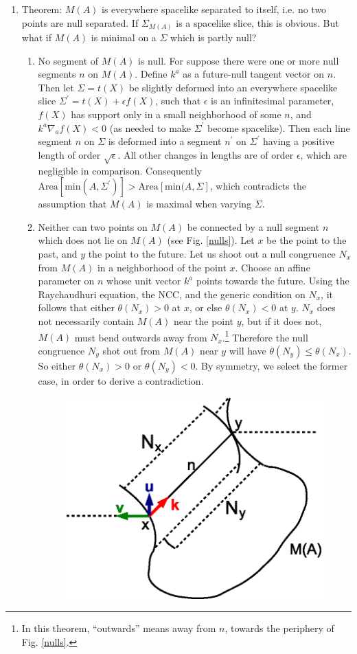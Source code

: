 \documentclass[12pt]{article}
\begin{document}
\begin{enumerate}[resume]
\item \label{notnull} Theorem: $M(A)$ is everywhere spacelike separated to itself, i.e. no two points are null separated.  If $\Sigma_{M(A)}$ is a spacelike slice, this is obvious.  But what if $M(A)$ is minimal on a $\Sigma$ which is partly null?
	\begin{enumerate}
	\item \label{segnull} No segment of $M(A)$ is null.  For suppose there were one or more null segments $n$ on $M(A)$.  Define $k^a$ as a future-null tangent vector on $n$.  Then let $\Sigma = t(X)$ be slightly deformed into an everywhere spacelike slice $\Sigma^\prime = t(X) + \epsilon f(X)$, such that $\epsilon$ is an infinitesimal parameter, $f(X)$ has support only in a small neighborhood of some $n$, and $k^a \nabla_a f(X) < 0$ (as needed to make $\Sigma^\prime$ become spacelike).  Then each line segment $n$ on $\Sigma$ is deformed into a segment $n^\prime$ on $\Sigma^\prime$ having a positive length of order $\sqrt{\epsilon}$.  All other changes in lengths are of order $\epsilon$, which are negligible in comparison.  Consequently $\mathrm{Area}[\mathrm{min}(A,\Sigma^\prime)] > \mathrm{Area}[\mathrm{min}(A,\Sigma]$,
which contradicts the assumption that $M(A)$ is maximal when varying $\Sigma$.
	\item Neither can two points on $M(A)$ be connected by a null segment $n$ which does not lie on $M(A)$ (see Fig. \ref{nulls}).   Let $x$ be the point to the past, and $y$ the point to the future.  Let us shoot out a null congruence $N_x$ from $M(A)$ in a neighborhood of the point $x$.   Choose an affine parameter on $n$ whose unit vector $k^a$ points towards the future.  Using the Raychaudhuri equation, the NCC, and the generic condition on $N_x$, it follows that either $\theta(N_x) > 0$ at $x$, or else $\theta(N_x) < 0$ at $y$.  $N_x$ does not necessarily contain $M(A)$ near the point $y$, but if it does not, $M(A)$ must bend outwards away from $N_x$.\footnote{In this theorem, ``outwards'' means away from $n$, towards the periphery of Fig. \ref{nulls}.}  Therefore the null congruence $N_y$ shot out from $M(A)$ near $y$ will have $\theta(N_y) \le \theta(N_x)$.  So either $\theta(N_x) > 0$ or $\theta(N_y) < 0$.  By symmetry, we select the former case, in order to derive a contradiction.
\begin{figure}[hbt]
\centering
\includegraphics[width=.5\textwidth]{nulls.eps}

\end{figure}
\end{enumerate}
\end{enumerate}
\end{document}
